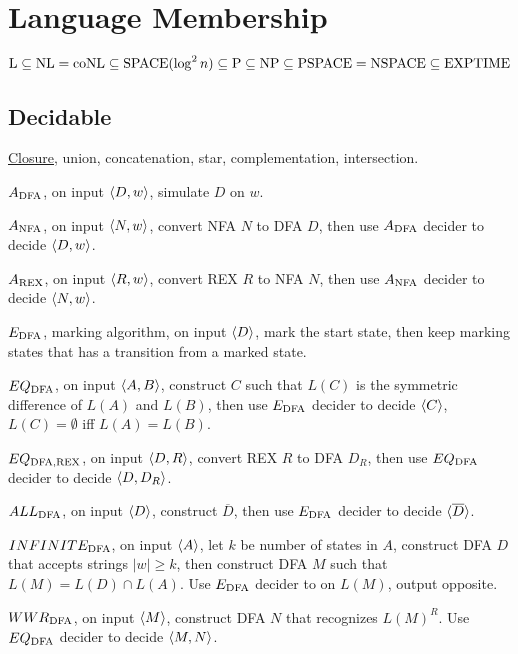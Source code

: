 \section{Language Membership}

\[
\text{L} \subseteq \text{NL} = \text{coNL} \subseteq \text{SPACE}(\log^2 n) \subseteq \text{P} \subseteq \text{NP} \subseteq \text{PSPACE} = \text{NSPACE} \subseteq \text{EXPTIME}
\]

\subsection{Decidable}

\hyperref[exe:DCDB_CLOSURE]{Closure}, union, concatenation, star, complementation, intersection.

\hyperref[lang:ADFA_DCDB]{$A_{\text{DFA}}$}, on input $\langle{D, w}\rangle$, simulate $D$ on $w$.

\hyperref[lang:ANFA_DCDB]{$A_{\text{NFA}}$}, on input $\langle{N, w}\rangle$, convert NFA $N$ to DFA $D$, then use $A_{\text{DFA}}$ decider to decide $\langle{D, w}\rangle$.

\hyperref[lang:AREX_DCDB]{$A_{\text{REX}}$}, on input $\langle{R, w}\rangle$, convert REX $R$ to NFA $N$, then use $A_{\text{NFA}}$ decider to decide $\langle{N, w}\rangle$. 

\hyperref[lang:EDFA_DCDB]{$E_{\text{DFA}}$}, marking algorithm, on input $\langle{D}\rangle$, mark the start state, then keep marking states that has a transition from a marked state.

\hyperref[lang:EQDFA_DCDB]{$EQ_{\text{DFA}}$}, on input $\langle{A, B}\rangle$, construct $C$ such that $L(C)$ is the symmetric difference of $L(A)$ and $L(B)$, then use $E_{\text{DFA}}$ decider to decide $\langle{C}\rangle$, $L(C) = \emptyset$ iff $L(A) = L(B)$.

\hyperref[lang:EQDFAREX_DCDB]{$EQ_{\text{DFA},\text{REX}}$}, on input $\langle{D, R}\rangle$, convert REX $R$ to DFA $D_R$, then use $EQ_{\text{DFA}}$ decider to decide $\langle{D, D_R}\rangle$. 

\hyperref[lang:ALLDFA_DCDB]{$ALL_{\text{DFA}}$}, on input $\langle{D}\rangle$, construct $\overline{D}$, then use $E_{\text{DFA}}$ decider to decide $\langle{\overline{D}}\rangle$.

\hyperref[lang:INFINITEDFA_DCDB]{$INFINITE_{\text{DFA}}$}, on input $\langle{A}\rangle$, let $k$ be number of states in $A$, construct DFA $D$ that accepts strings $|w| \geq k$, then construct DFA $M$ such that $L(M) = L(D) \cap L(A)$. Use $E_{\text{DFA}}$ decider to on $L(M)$, output opposite.

\hyperref[lang:WWRDFA_DCDB]{$WWR_{\text{DFA}}$}, on input $\langle{M}\rangle$, construct DFA $N$ that recognizes $L(M)^R$. Use $EQ_{\text{DFA}}$ decider to decide $\langle{M, N}\rangle$.

